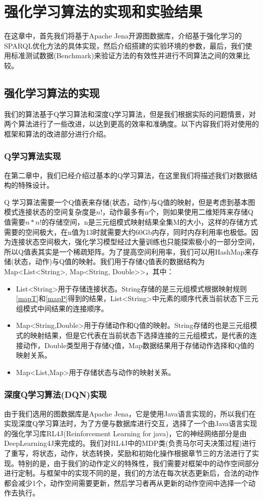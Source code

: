 \chapter{强化学习算法的实现和实验结果}
在这章中，首先我们将基于Apache Jena开源图数据库，介绍基于强化学习的SPARQL优化方法的具体实现，然后介绍搭建的实验环境的参数，最后，我们使用标准测试数据(Benchmark)来验证方法的有效性并进行不同算法之间的效果比较。
\section{强化学习算法的实现}
我们的算法基于Q学习算法和深度Q学习算法，但是我们根据实际的问题情景，对两个算法进行了一些改进，以达到更高的效率和准确度。以下内容我们将对使用的框架和算法的改进部分进行介绍。
\subsection{Q学习算法实现}
在第二章中，我们已经介绍过基本的Q学习算法，在这里我们将描述我们对数据结构的特殊设计。

Q 学习算法需要一个Q值表来存储(状态，动作)与Q值的映射，但是考虑到基本图模式连接状态的空间复杂度是$n!$，动作最多有n个，则如果使用二维矩阵来存储Q值需要$n*n!$的存储空间，n是三元组模式映射结果全集M的大小，这样的存储方式需要的空间极大，在n值为13时就需要大约60Gb内存，同时内存利用率也极低。因为连接状态空间极大，强化学习模型经过大量训练也只能探索极小的一部分空间，所以Q值表其实是一个稀疏矩阵。为了提高空间利用率，我们可以用HashMap来存储(状态，动作)与Q值的映射。我们用于存储Q值表的数据结构为Map<List<String>, Map<String, Double>>，其中：
\begin{itemize}
    \item List<String>用于存储连接状态。String存储的是三元组模式根据映射规则\ref{mapT}和\ref{mapP}得到的结果，List<String>中元素的顺序代表当前状态下三元组模式中间结果的连接顺序。
    \item Map<String,Double>用于存储动作和Q值的映射。String存储的也是三元组模式的映射结果，但是它代表在当前状态下选择连接的三元组模式，是代表的连接动作，Double类型用于存储Q值，Map数据结果用于存储动作选择和Q值的映射关系。
    \item Map<List,Map>用于存储状态与动作的映射关系。
\end{itemize}

\subsection{深度Q学习算法(DQN)实现}
由于我们选用的图数据库是Apache Jena，它是使用Java语言实现的，所以我们在实现深度Q学习算法时，为了方便与数据库进行交互，选择了一个由Java语言实现的强化学习库RL4J(Reinforcement Learning for java)，它的神经网络部分是由DeepLearning4J来完成的。我们对RL4J中的MDP类(负责马尔可夫决策过程)进行了重写，将状态，动作，状态转换，奖励和初始化操作根据章节三的方法进行了实现。特别的是，由于我们的动作定义的特殊性，我们需要对框架中的动作空间部分进行定制。与框架中的实现不同的是，我们的方法在每次状态更新后，合法的动作都会减少1个，动作空间需要更新，然后学习者再从更新的动作空间中选择一个动作去执行。

